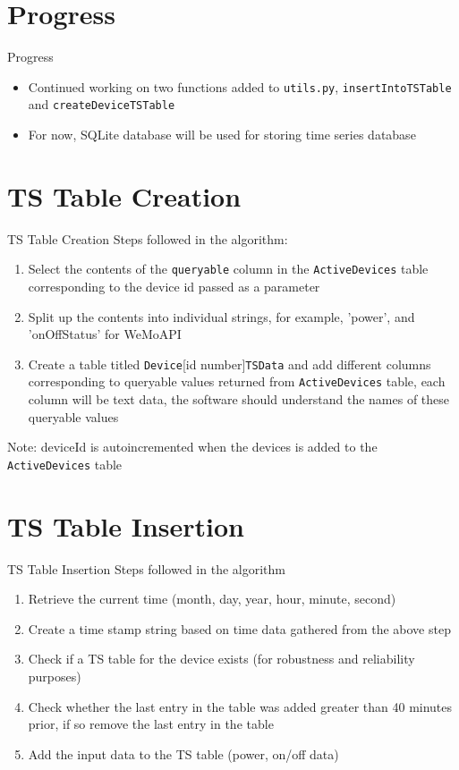 \documentclass{beamer}
\begin{document}
\section{Progress}
\begin{frame}{Progress}{}
	\begin{itemize}
		\item Continued working on two functions added to \texttt{utils.py}, \texttt{insertIntoTSTable} and \texttt{createDeviceTSTable}
		\item For now, SQLite database will be used for storing time series database
	\end{itemize}
\end{frame}

\section{TS Table Creation}
\begin{frame}{TS Table Creation}{}
Steps followed in the algorithm: 
	\begin{enumerate}
		\item Select the contents of the \texttt{queryable} column in the \texttt{ActiveDevices} table corresponding to the device id passed as a parameter
		\item Split up the contents into individual strings, for example, 'power', and 'onOffStatus' for WeMoAPI
		\item Create a table titled \texttt{Device}[id number]\texttt{TSData} and add different columns corresponding to queryable values returned from \texttt{ActiveDevices} table, each column will be text data, the software should understand the names of these queryable values
	\end{enumerate}
	Note: deviceId is autoincremented when the devices is added to the \texttt{ActiveDevices} table
\end{frame}

\section{TS Table Insertion}
\begin{frame}{TS Table Insertion}{}
Steps followed in the algorithm
\begin{enumerate}
\item Retrieve the current time (month, day, year, hour, minute, second)
\item Create a time stamp string based on time data gathered from the above step
\item Check if a TS table for the device exists (for robustness and reliability purposes)
\item Check whether the last entry in the table was added greater than 40 minutes prior, if so remove the last entry in the table
\item Add the input data to the TS table (power, on/off data)
\end{enumerate}
\end{frame}
\end{document}
